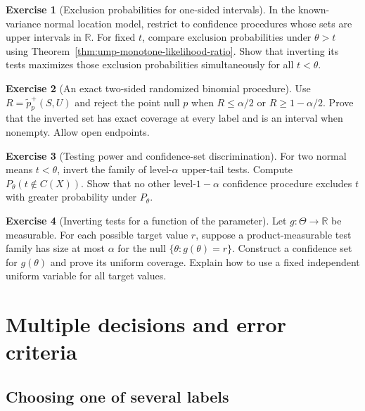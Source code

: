 \documentclass[11pt,oneside]{book}
\theoremstyle{definition}
\newtheorem{exercise}{Exercise}[section]
\theoremstyle{remark}
\newcommand{\R}{\mathbb R}
\begin{document}
\begin{exercise}[Exclusion probabilities for one-sided intervals]
\label{exer:confidence-normal-ump-lower-bound}
In the known-variance normal location model, restrict to
confidence procedures whose sets are upper intervals in $\R$.
For fixed $t$, compare exclusion probabilities under $\theta>t$
using Theorem~\ref{thm:ump-monotone-likelihood-ratio}.
Show that inverting its tests maximizes those exclusion
probabilities simultaneously for all $t<\theta$.
\end{exercise}

\begin{exercise}[An exact two-sided randomized binomial procedure]
\label{exer:confidence-binomial-two-sided-randomized}
Use $R=\widetilde p_p^+(S,U)$ and reject the point null $p$
when $R\leq\alpha/2$ or $R\geq1-\alpha/2$. Prove that
the inverted set has exact coverage at every label and
is an interval when nonempty. Allow open endpoints.
\end{exercise}

\begin{exercise}[Testing power and confidence-set discrimination]
\label{exer:confidence-false-label-power}
For two normal means $t<\theta$, invert the family of
level-$\alpha$ upper-tail tests. Compute $P_\theta(t\notin C(X))$.
Show that no other level-$1-\alpha$ confidence procedure
excludes $t$ with greater probability under $P_\theta$.
\end{exercise}

\begin{exercise}[Inverting tests for a function of the parameter]
\label{exer:confidence-target-composite-null}
Let $g:\Theta\to\R$ be measurable. For each possible target
value $r$, suppose a product-measurable test family has
size at most $\alpha$ for the null $\{\theta:g(\theta)=r\}$.
Construct a confidence set for $g(\theta)$ and prove its
uniform coverage. Explain how to use a fixed independent
uniform variable for all target values.
\end{exercise}



\clearpage
\section{Multiple decisions and error criteria}
\label{sec:multiple-decisions-error-criteria}

\subsection{Choosing one of several labels}
\label{subsec:multiclass-decision-error}
\end{document}
